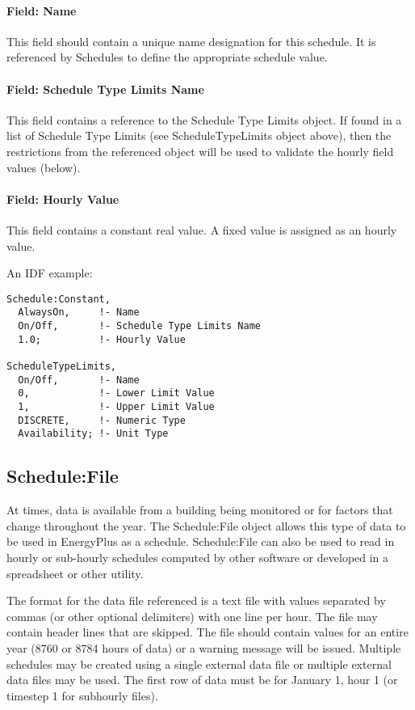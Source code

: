 \paragraph{Field: Name}\label{field-name-7-018}

This field should contain a unique name designation for this schedule. It is referenced by Schedules to define the appropriate schedule value.

\paragraph{Field: Schedule Type Limits Name}\label{field-schedule-type-limits-name-5}

This field contains a reference to the Schedule Type Limits object. If found in a list of Schedule Type Limits (see ScheduleTypeLimits object above), then the restrictions from the referenced object will be used to validate the hourly field values (below).

\paragraph{Field: Hourly Value}\label{field-hourly-value}

This field contains a constant real value. A fixed value is assigned as an hourly value.

An IDF example:

\begin{lstlisting}
Schedule:Constant,
  AlwaysOn,     !- Name
  On/Off,       !- Schedule Type Limits Name
  1.0;          !- Hourly Value

ScheduleTypeLimits,
  On/Off,       !- Name
  0,            !- Lower Limit Value
  1,            !- Upper Limit Value
  DISCRETE,     !- Numeric Type
  Availability; !- Unit Type
\end{lstlisting}

\subsection{Schedule:File}\label{schedulefile}

At times, data is available from a building being monitored or for factors that change throughout the year. The Schedule:File object allows this type of data to be used in EnergyPlus as a schedule. Schedule:File can also be used to read in hourly or sub-hourly schedules computed by other software or developed in a spreadsheet or other utility.

The format for the data file referenced is a text file with values separated by commas (or other optional delimiters) with one line per hour. The file may contain header lines that are skipped. The file should contain values for an entire year (8760 or 8784 hours of data) or a warning message will be issued. Multiple schedules may be created using a single external data file or multiple external data files may be used. The first row of data must be for January 1, hour 1 (or timestep 1 for subhourly files).

